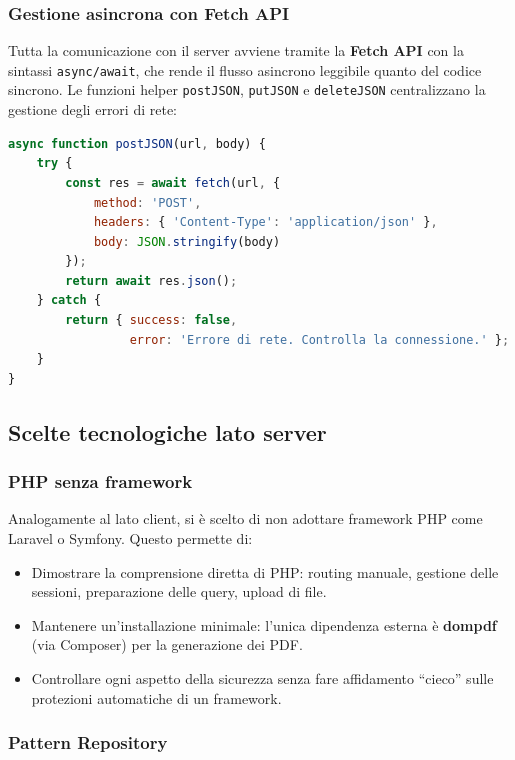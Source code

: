 \documentclass[12pt, a4paper]{article}
\begin{document}
\subsubsection{Gestione asincrona con Fetch API}

Tutta la comunicazione con il server avviene tramite la \textbf{Fetch API} con la
sintassi \texttt{async/await}, che rende il flusso asincrono leggibile quanto del
codice sincrono. Le funzioni helper \texttt{postJSON}, \texttt{putJSON} e
\texttt{deleteJSON} centralizzano la gestione degli errori di rete:

\begin{lstlisting}[language=JavaScript, caption={Funzione helper per richieste POST in JSON.}]
async function postJSON(url, body) {
    try {
        const res = await fetch(url, {
            method: 'POST',
            headers: { 'Content-Type': 'application/json' },
            body: JSON.stringify(body)
        });
        return await res.json();
    } catch {
        return { success: false,
                 error: 'Errore di rete. Controlla la connessione.' };
    }
}
\end{lstlisting}

\subsection{Scelte tecnologiche lato server}

\subsubsection{PHP senza framework}

Analogamente al lato client, si è scelto di non adottare framework PHP come Laravel o
Symfony. Questo permette di:

\begin{itemize}
    \item Dimostrare la comprensione diretta di PHP: routing manuale, gestione delle
    sessioni, preparazione delle query, upload di file.
    \item Mantenere un'installazione minimale: l'unica dipendenza esterna è
    \textbf{dompdf} (via Composer) per la generazione dei PDF.
    \item Controllare ogni aspetto della sicurezza senza fare affidamento
    ``cieco'' sulle protezioni automatiche di un framework.
\end{itemize}

\subsubsection{Pattern Repository}
\end{document}
